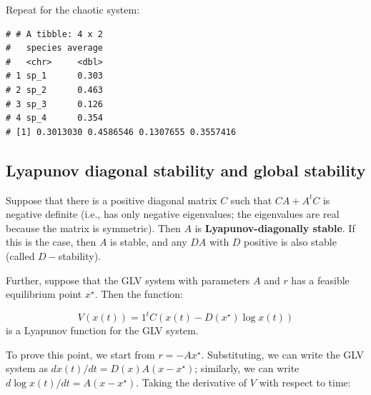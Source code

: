 \documentclass[
]{book}
\newenvironment{Shaded}{\begin{snugshade}}{\end{snugshade}}
\newcommand{\CommentTok}[1]{\textcolor[rgb]{0.56,0.35,0.01}{\textit{#1}}}
\newcommand{\DataTypeTok}[1]{\textcolor[rgb]{0.13,0.29,0.53}{#1}}
\newcommand{\DecValTok}[1]{\textcolor[rgb]{0.00,0.00,0.81}{#1}}
\newcommand{\KeywordTok}[1]{\textcolor[rgb]{0.13,0.29,0.53}{\textbf{#1}}}
\newcommand{\NormalTok}[1]{#1}
\newcommand{\OperatorTok}[1]{\textcolor[rgb]{0.81,0.36,0.00}{\textbf{#1}}}
\newcommand{\StringTok}[1]{\textcolor[rgb]{0.31,0.60,0.02}{#1}}
\begin{document}
Repeat for the chaotic system:

\begin{Shaded}
\end{Shaded}

\begin{verbatim}
# # A tibble: 4 x 2
#   species average
#   <chr>     <dbl>
# 1 sp_1      0.303
# 2 sp_2      0.463
# 3 sp_3      0.126
# 4 sp_4      0.354
# [1] 0.3013030 0.4586546 0.1307655 0.3557416
\end{verbatim}

\hypertarget{lyapunov-diagonal-stability-and-global-stability}{%
\subsection{Lyapunov diagonal stability and global stability}\label{lyapunov-diagonal-stability-and-global-stability}}

Suppose that there is a positive diagonal matrix \(C\) such that \(C A + A^t C\) is negative definite (i.e., has only negative eigenvalues; the eigenvalues are real because the matrix is symmetric). Then \(A\) is \textbf{Lyapunov-diagonally stable}. If this is the case, then \(A\) is stable, and any \(D A\) with \(D\) positive is also stable (called \(D-\)stability).

Further, suppose that the GLV system with parameters \(A\) and \(r\) has a feasible equilibrium point \(x^\star\). Then the function:

\[
V(x(t)) = 1^t C \left( x(t) -D(x^\star) \log x(t)\right)
\]
is a Lyapunov function for the GLV system.

To prove this point, we start from \(r = -Ax^\star\). Substituting, we can write the GLV system as \(dx(t)/dt = D(x)A(x - x^\star)\); similarly, we can write \(d \log x(t)/dt = A(x - x^\star)\). Taking the derivative of \(V\) with respect to time:
\end{document}
